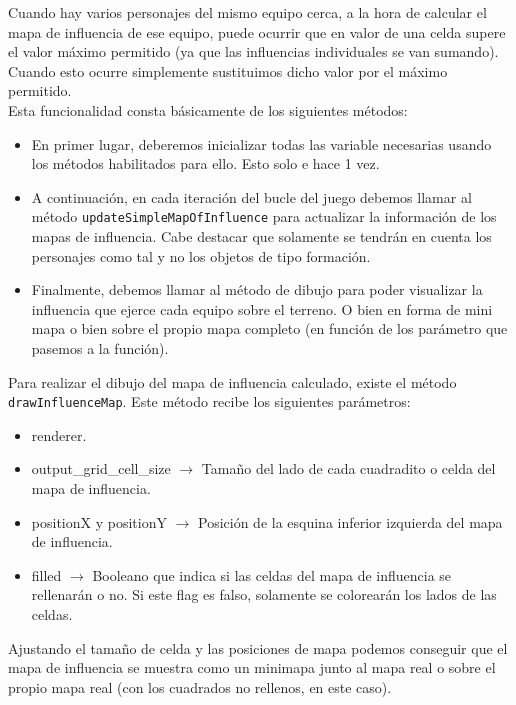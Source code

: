 Cuando hay varios personajes del mismo equipo cerca, a la hora de calcular el mapa de influencia de ese equipo, puede ocurrir que en valor de una celda supere el valor máximo permitido (ya que las influencias individuales se van sumando). Cuando esto ocurre simplemente sustituimos dicho valor por el máximo permitido. \\ 

Esta funcionalidad consta básicamente de los siguientes métodos:
\begin{itemize}
	\item En primer lugar, deberemos inicializar todas las variable necesarias usando los métodos habilitados para ello. Esto solo e hace 1 vez.
	\item A continuación, en cada iteración del bucle del juego debemos llamar al método \texttt{updateSimpleMapOfInfluence} para actualizar la información de los mapas de influencia. Cabe destacar que solamente se tendrán en cuenta los personajes como tal y no los objetos de tipo formación.
	\item Finalmente, debemos llamar al método de dibujo para poder visualizar la influencia que ejerce cada equipo sobre el terreno. O bien en forma de mini mapa o bien sobre el propio mapa completo (en función de los parámetro que pasemos a la función).	
\end{itemize}

Para realizar el dibujo del mapa de influencia calculado, existe el método \texttt{drawInfluenceMap}. Este método recibe los siguientes parámetros:
\begin{itemize}
	\item renderer.
	\item output\_grid\_cell\_size $\rightarrow$ Tamaño del lado de cada cuadradito o celda del mapa de influencia.
	\item positionX y positionY $\rightarrow$ Posición de la esquina inferior izquierda del mapa de influencia.
	\item filled $\rightarrow$ Booleano que indica si las celdas del mapa de influencia se rellenarán o no. Si este flag es falso, solamente se colorearán los lados de las celdas.
\end{itemize}

Ajustando el tamaño de celda y las posiciones de mapa podemos conseguir que el mapa de influencia se muestra como un minimapa junto al mapa real o sobre el propio mapa real (con los cuadrados no rellenos, en este caso). \\

